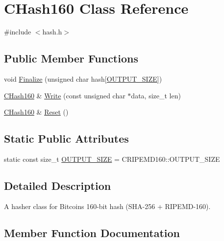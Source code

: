 \hypertarget{class_c_hash160}{}\section{C\+Hash160 Class Reference}
\label{class_c_hash160}


{\ttfamily \#include $<$hash.\+h$>$}

\subsection*{Public Member Functions}
\begin{DoxyCompactItemize}
\item 
void \hyperlink{class_c_hash160_a9bb08e1772002ae1a5d85017ba7952ee}{Finalize} (unsigned char hash\mbox{[}\hyperlink{class_c_hash160_a1a5618e17d91ea96e86d779f575211eb}{O\+U\+T\+P\+U\+T\+\_\+\+S\+I\+Z\+E}\mbox{]})
\item 
\hyperlink{class_c_hash160}{C\+Hash160} \& \hyperlink{class_c_hash160_af56cdd9443013eb68b246aa8450217f2}{Write} (const unsigned char $\ast$data, size\+\_\+t len)
\item 
\hyperlink{class_c_hash160}{C\+Hash160} \& \hyperlink{class_c_hash160_a971a8d59073455b1ef0ac0f65e964772}{Reset} ()
\end{DoxyCompactItemize}
\subsection*{Static Public Attributes}
\begin{DoxyCompactItemize}
\item 
static const size\+\_\+t \hyperlink{class_c_hash160_a1a5618e17d91ea96e86d779f575211eb}{O\+U\+T\+P\+U\+T\+\_\+\+S\+I\+Z\+E} = C\+R\+I\+P\+E\+M\+D160\+::\+O\+U\+T\+P\+U\+T\+\_\+\+S\+I\+Z\+E
\end{DoxyCompactItemize}


\subsection{Detailed Description}
A hasher class for Bitcoin\textquotesingle{}s 160-\/bit hash (S\+H\+A-\/256 + R\+I\+P\+E\+M\+D-\/160). 

\subsection{Member Function Documentation}
\hypertarget{class_c_hash160_a9bb08e1772002ae1a5d85017ba7952ee}{}
